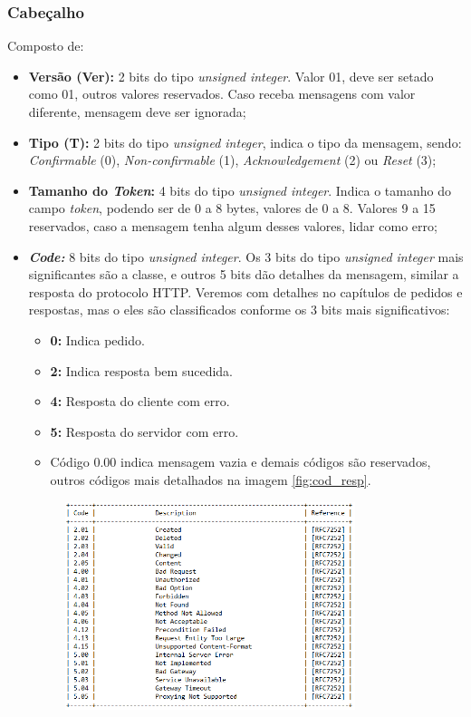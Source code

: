 \subsubsection{Cabeçalho}

Composto de: 
\begin{itemize}
	\item \textbf{Versão (Ver):} 2 bits do tipo  \textit{unsigned integer}. Valor 01, deve ser setado como 01, outros valores reservados. Caso receba mensagens com valor diferente, mensagem deve ser ignorada;
	\item \textbf{Tipo (T):} 2 bits do tipo  \textit{unsigned integer}, indica o tipo da mensagem, sendo: \textit{Confirmable} (0), \textit{Non-confirmable} (1), \textit{Acknowledgement} (2) ou \textit{Reset} (3);
	\item \textbf{Tamanho do \textit{Token}:} 4 bits do tipo  \textit{unsigned integer}. Indica o tamanho do campo \textit{token}, podendo ser de 0 a 8 bytes, valores de 0 a 8. Valores 9 a 15 reservados, caso a mensagem tenha algum desses valores, lidar como erro;
	\item \textbf{\textit{Code:}} 8 bits do tipo  \textit{unsigned integer}. Os 3 bits do tipo  \textit{unsigned integer} mais significantes são a classe, e outros 5 bits dão detalhes da mensagem, similar a resposta do protocolo HTTP. Veremos com detalhes no capítulos de pedidos e respostas, mas o eles são classificados conforme os 3 bits mais significativos:
	\begin{itemize}
		\item \textbf{0: } Indica pedido.
		\item \textbf{2: } Indica resposta bem sucedida.
		\item \textbf{4: } Resposta do cliente com erro.
		\item \textbf{5: } Resposta do servidor com erro.
		\item Código 0.00 indica mensagem vazia e demais códigos são reservados, outros códigos mais detalhados na imagem \ref{fig:cod_resp}. %
	\end{itemize}
	\begin{figure}[!htb]
		\centering
		\includegraphics[width=0.8\textwidth]{CODE_RESPOSTAS}

\end{figure}
\end{itemize}
